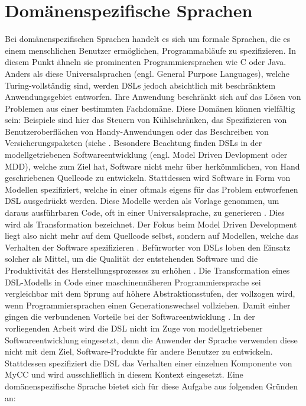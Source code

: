 \section{Domänenspezifische Sprachen}
Bei domänenspezifischen Sprachen handelt es sich um formale Sprachen, die es einem menschlichen Benutzer ermöglichen, Programmabläufe zu spezifizieren. In diesem Punkt ähneln sie prominenten Programmiersprachen wie C oder Java. Anders als diese Universalsprachen (engl. General Purpose Languages), welche Turing-vollständig sind, werden DSLs jedoch absichtlich mit beschränktem Anwendungsgebiet entworfen. Ihre Anwendung beschränkt sich auf das Lösen von Problemen aus einer bestimmten Fachdomäne. Diese Domänen können vielfältig sein: Beispiele sind hier das Steuern von Kühlschränken, das Spezifizieren von Benutzeroberflächen von Handy-Anwendungen oder das Beschreiben von Versicherungspaketen (siehe \cite[S. 93ff.]{Kelly:08}. Besondere Beachtung finden DSLs in der modellgetriebenen Softwareentwicklung (engl. Model Driven Devlopment oder MDD), welche zum Ziel hat, Software nicht mehr über herkömmlichen, von Hand geschriebenen Quellcode zu entwickeln. Stattdessen wird Software in Form von Modellen spezifiziert, welche in einer oftmals eigens für das Problem entworfenen DSL ausgedrückt werden. Diese Modelle werden als Vorlage genommen, um daraus ausführbaren Code, oft in einer  Universalsprache, zu generieren \cite[S. 29]{Voelter:13}. Dies wird als Transformation bezeichnet. Der Fokus beim Model Driven Development liegt also nicht mehr auf dem Quellcode selbst, sondern auf Modellen, welche das Verhalten der Software spezifizieren \cite[S. 3]{Kleppe:09}. Befürworter von DSLs loben den Einsatz solcher als Mittel, um die Qualität der entstehenden Software und die Produktivität des Herstellungsprozesses zu erhöhen \cite[S. 33f]{Fowler:11}. Die Transformation eines DSL-Modells in Code einer maschinennäheren Programmiersprache sei vergleichbar mit dem Sprung auf höhere Abstraktionsstufen, der vollzogen wird, wenn Programmiersprachen einen Generationswechsel vollziehen. Damit einher gingen die verbundenen Vorteile bei der Softwareentwicklung \cite[S. 15ff]{Kelly:08}.
\newline
In der vorliegenden Arbeit wird die DSL nicht im Zuge von modellgetriebener Softwareentwicklung eingesetzt, denn die Anwender der Sprache verwenden diese nicht mit dem Ziel, Software-Produkte für andere Benutzer zu entwickeln. Stattdessen spezifiziert die DSL das Verhalten einer einzelnen Komponente von MyCC und wird ausschließlich in diesem Kontext eingesetzt. Eine domänenspezifische Sprache bietet sich für diese Aufgabe aus folgenden Gründen an: 
